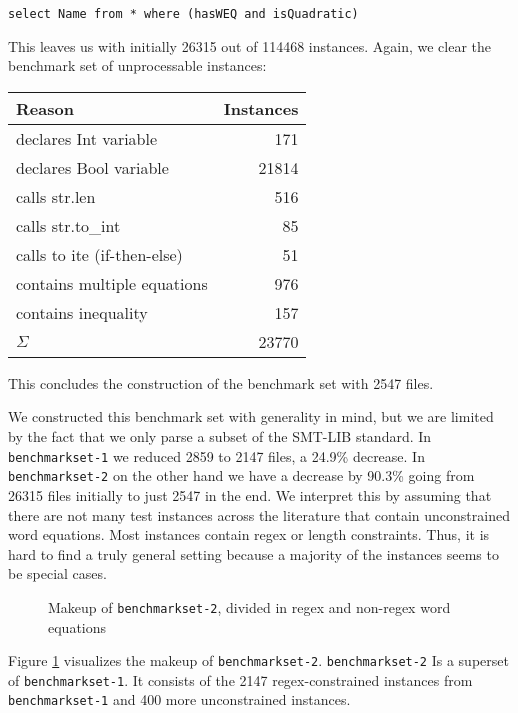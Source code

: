 \begin{verbatim}
select Name from * where (hasWEQ and isQuadratic)
\end{verbatim}

This leaves us with initially 26315 out of 114468 instances. Again, we clear the benchmark set of unprocessable instances:

\begin{center}
\begin{tabular}{|l|r|}
    \hline
    Reason & Instances \\
    \hline
    declares Int variable & 171 \\
    declares Bool variable & 21814 \\
    calls str.len & 516 \\
    calls str.to\_int & 85 \\
    calls to ite (if-then-else) & 51 \\
    contains multiple equations & 976 \\
    contains inequality & 157 \\
    \hline
    $\Sigma$ & 23770 \\
    \hline
\end{tabular}
\end{center}

This concludes the construction of the benchmark set with 2547 files.

We constructed this benchmark set with generality in mind, but we are limited by the fact that we only parse a subset of the SMT-LIB standard. In \texttt{benchmarkset-1} we reduced 2859 to 2147 files, a 24.9\% decrease. In \texttt{benchmarkset-2} on the other hand we have a decrease by 90.3\% going from 26315 files initially to just 2547 in the end.
We interpret this by assuming that there are not many test instances across the literature that contain unconstrained word equations. Most instances contain regex or length constraints. Thus, it is hard to find a truly general setting because a majority of the instances seems to be special cases.

\begin{figure}[H]
\begin{center}
\resizebox{0.5 \textwidth}{!}{

}
\caption{Makeup of \texttt{benchmarkset-2}, divided in regex and non-regex word equations}
\label{fig:pie}
\end{center}
\end{figure}

Figure \ref{fig:pie} visualizes the makeup of \texttt{benchmarkset-2}. \texttt{benchmarkset-2} Is a superset of \texttt{benchmarkset-1}. It consists of the 2147 regex-constrained instances from \texttt{benchmarkset-1} and 400 more unconstrained instances.


